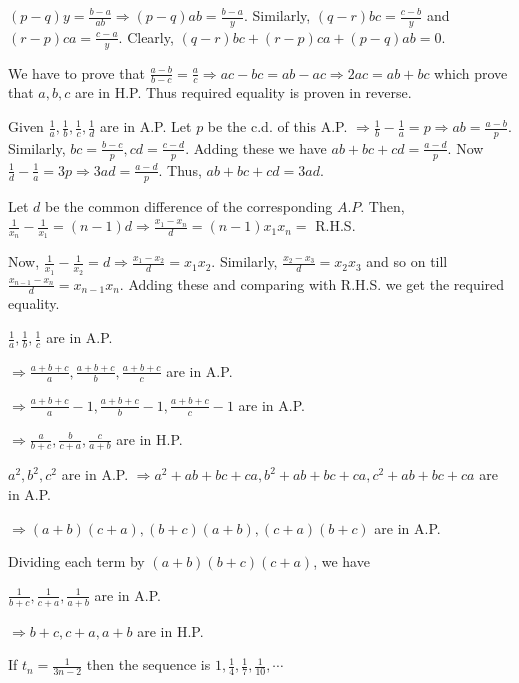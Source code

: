   $(p - q)y = \frac{b - a}{ab}\Rightarrow (p - q)ab = \frac{b - a}{y}$. Similarly, $(q - r)bc = \frac{c -
  b}{y}$ and $(r - p)ca = \frac{c - a}{y}$. Clearly, $(q - r)bc + (r - p)ca + (p - q)ab = 0$.
\item We have to prove that $\frac{a - b}{b - c} = \frac{a}{c}\Rightarrow ac - bc = ab - ac \Rightarrow 2ac
  = ab + bc$ which prove that $a, b, c$ are in H.P. Thus required equality is proven in reverse.
\item Given $\frac{1}{a}, \frac{1}{b}, \frac{1}{c}, \frac{1}{d}$ are in A.P. Let $p$ be the c.d. of this
  A.P. $\Rightarrow \frac{1}{b} - \frac{1}{a} = p \Rightarrow ab = \frac{a - b}{p}$. Similarly, $bc =
  \frac{b - c}{p}, cd = \frac{c - d}{p}$. Adding these we have $ab + bc + cd = \frac{a - d}{p}$. Now
  $\frac{1}{d} - \frac{1}{a} = 3p \Rightarrow 3ad = \frac{a - d}{p}$. Thus, $ab + bc + cd = 3ad$.
\item Let $d$ be the common difference of the corresponding $A.P.$ Then, $\frac{1}{x_n} - \frac{1}{x_1} = (n
  - 1)d \Rightarrow \frac{x_1 - x_n}{d} = (n - 1)x_1x_n =$ R.H.S.

  Now, $\frac{1}{x_1} - \frac{1}{x_2} = d \Rightarrow \frac{x_1 - x_2}{d} = x_1x_2$. Similarly, $\frac{x_2
    - x_3}{d} = x_2x_3$ and so on till $\frac{x_{n - 1} - x_n}{d} = x_{n - 1}x_n$. Adding these and
  comparing with R.H.S. we get the required equality.
\item $\frac{1}{a}, \frac{1}{b}, \frac{1}{c}$ are in A.P.

  $\Rightarrow \frac{a + b + c}{a}, \frac{a + b + c}{b}, \frac{a + b + c}{c}$ are in A.P.

  $\Rightarrow \frac{a + b + c}{a} -1, \frac{a + b + c}{b} - 1, \frac{a + b + c}{c} -1$ are in A.P.

  $\Rightarrow \frac{a}{b + c}, \frac{b}{c + a}, \frac{c}{a + b}$ are in H.P.
\item $a^2, b^2, c^2$ are in A.P. $\Rightarrow a^2 + ab + bc + ca, b^2 + ab + bc + ca, c^2 + ab + bc + ca$
  are in A.P.

  $\Rightarrow (a + b)(c + a), (b + c)(a + b), (c + a)(b + c)$ are in A.P.

  Dividing each term by $(a + b)(b + c)(c + a)$, we have

  $\frac{1}{b + c}, \frac{1}{c + a}, \frac{1}{a + b}$ are in A.P.

  $\Rightarrow b + c, c + a, a + b$ are in H.P.
\item If $t_n = \frac{1}{3n - 2}$ then the sequence is $1, \frac{1}{4}, \frac{1}{7}, \frac{1}{10}, \cdots$

